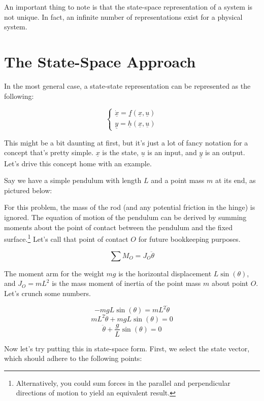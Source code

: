 \documentclass[
  letterpaper,
  DIV=11,
  numbers=noendperiod]{scrreprt}
\begin{document}
An important thing to note is that the state-space representation of a
system is not unique. In fact, an infinite number of representations
exist for a physical system.

\hypertarget{the-state-space-approach}{%
\section{The State-Space Approach}\label{the-state-space-approach}}

In the most general case, a state-state representation can be
represented as the following:

\begin{equation*}
    \left\{ \begin{array}{ll}
        \underline{\dot{x}} = \underline{f}(\underline{x}, \underline{u}) \\
        \underline{y} = \underline{h}(\underline{x}, \underline{u})
    \end{array} \right.
\end{equation*}

This might be a bit daunting at first, but it's just a lot of fancy
notation for a concept that's pretty simple. \(\underline{x}\) is the
state, \(\underline{u}\) is an input, and \(\underline{y}\) is an
output. Let's drive this concept home with an example.

Say we have a simple pendulum with length \(L\) and a point mass \(m\)
at its end, as pictured below:

For this problem, the mass of the rod (and any potential friction in the
hinge) is ignored. The equation of motion of the pendulum can be derived
by summing moments about the point of contact between the pendulum and
the fixed surface.\footnote{Alternatively, you could sum forces in the
  parallel and perpendicular directions of motion to yield an equivalent
  result.} Let's call that point of contact \(O\) for future bookkeeping
purposes.

\[\sum{M_O} = J_O \ddot{\theta}\]

The moment arm for the weight \(mg\) is the horizontal displacement
\(L \sin(\theta)\), and \(J_O = mL^2\) is the mass moment of inertia of
the point mass \(m\) about point \(O\). Let's crunch some numbers.

\[-mgL \sin(\theta) = mL^2 \ddot{\theta}\]
\[mL^2 \ddot{\theta} + mgL \sin(\theta) = 0\]
\[\ddot{\theta} + \frac{g}{L} \sin(\theta) = 0\]

Now let's try putting this in state-space form. First, we select the
state vector, which should adhere to the following points:
\end{document}
